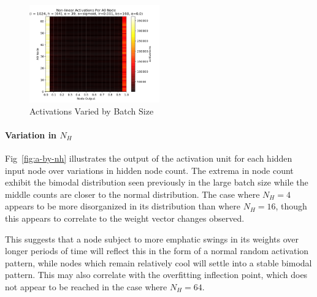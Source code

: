 \documentclass[10pt,epsf]{article}
\begin{document}
{{\begin{figure}[h]
      \includegraphics[width=0.5\textwidth]{./img/64-0.001-160-0-sigmoid-1/activations-A0-255.png}
      \caption{Activations Varied by Batch Size}
      \label{fig:a-by-b}
    \end{figure}
    \paragraph{Variation in $N_H$}{
      Fig~\ref{fig:a-by-nh} illustrates the output of the activation unit for each hidden input node
      over variations in hidden node count. The extrema in node count exhibit the bimodal distribution
      seen previously in the large batch size while the middle counts are closer to the normal
      distribution. The case where $N_H = 4$ appears to be more disorganized in its distribution
      than where $N_H = 16$, though this appears to correlate to the weight vector changes observed.

      This suggests that a node subject to more emphatic swings in its weights over longer periods of
      time will reflect this in the form of a normal random activation pattern, while nodes which remain
      relatively cool will settle into a stable bimodal pattern. This may also correlate with
      the overfitting inflection point, which does not appear to be reached in the case where $N_H = 64$.

}}}
\end{document}
